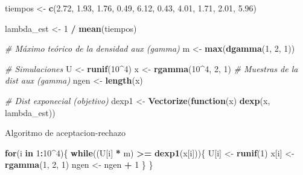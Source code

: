 \documentclass[
]{article}
\newenvironment{Shaded}{\begin{snugshade}}{\end{snugshade}}
\newcommand{\CommentTok}[1]{\textcolor[rgb]{0.56,0.35,0.01}{\textit{#1}}}
\newcommand{\ControlFlowTok}[1]{\textcolor[rgb]{0.13,0.29,0.53}{\textbf{#1}}}
\newcommand{\DecValTok}[1]{\textcolor[rgb]{0.00,0.00,0.81}{#1}}
\newcommand{\FloatTok}[1]{\textcolor[rgb]{0.00,0.00,0.81}{#1}}
\newcommand{\FunctionTok}[1]{\textcolor[rgb]{0.13,0.29,0.53}{\textbf{#1}}}
\newcommand{\NormalTok}[1]{#1}
\newcommand{\OtherTok}[1]{\textcolor[rgb]{0.56,0.35,0.01}{#1}}
\newcommand{\SpecialCharTok}[1]{\textcolor[rgb]{0.81,0.36,0.00}{\textbf{#1}}}
\begin{document}
\begin{Shaded}
\begin{Highlighting}[]
\NormalTok{tiempos }\OtherTok{\textless{}{-}} \FunctionTok{c}\NormalTok{(}\FloatTok{2.72}\NormalTok{, }\FloatTok{1.93}\NormalTok{, }\FloatTok{1.76}\NormalTok{, }\FloatTok{0.49}\NormalTok{, }\FloatTok{6.12}\NormalTok{, }\FloatTok{0.43}\NormalTok{, }\FloatTok{4.01}\NormalTok{, }\FloatTok{1.71}\NormalTok{, }\FloatTok{2.01}\NormalTok{, }\FloatTok{5.96}\NormalTok{)}

\NormalTok{lambda\_est }\OtherTok{\textless{}{-}} \DecValTok{1} \SpecialCharTok{/} \FunctionTok{mean}\NormalTok{(tiempos)}

\CommentTok{\# Máximo teórico de la densidad aux (gamma)}
\NormalTok{m }\OtherTok{\textless{}{-}} \FunctionTok{max}\NormalTok{(}\FunctionTok{dgamma}\NormalTok{(}\DecValTok{1}\NormalTok{, }\DecValTok{2}\NormalTok{, }\DecValTok{1}\NormalTok{))}

\CommentTok{\# Simulaciones}
\NormalTok{U }\OtherTok{\textless{}{-}} \FunctionTok{runif}\NormalTok{(}\DecValTok{10}\SpecialCharTok{\^{}}\DecValTok{4}\NormalTok{)}
\NormalTok{x }\OtherTok{\textless{}{-}} \FunctionTok{rgamma}\NormalTok{(}\DecValTok{10}\SpecialCharTok{\^{}}\DecValTok{4}\NormalTok{, }\DecValTok{2}\NormalTok{, }\DecValTok{1}\NormalTok{)  }\CommentTok{\# Muestras de la dist aux (gamma)}
\NormalTok{ngen }\OtherTok{\textless{}{-}} \FunctionTok{length}\NormalTok{(x)}

\CommentTok{\# Dist exponecial (objetivo)}
\NormalTok{dexp1 }\OtherTok{\textless{}{-}} \FunctionTok{Vectorize}\NormalTok{(}\ControlFlowTok{function}\NormalTok{(x) }\FunctionTok{dexp}\NormalTok{(x, lambda\_est))}
\end{Highlighting}
\end{Shaded}

Algoritmo de aceptacion-rechazo

\begin{Shaded}
\begin{Highlighting}[]
\ControlFlowTok{for}\NormalTok{(i }\ControlFlowTok{in} \DecValTok{1}\SpecialCharTok{:}\DecValTok{10}\SpecialCharTok{\^{}}\DecValTok{4}\NormalTok{)\{}
  \ControlFlowTok{while}\NormalTok{((U[i] }\SpecialCharTok{*}\NormalTok{ m) }\SpecialCharTok{\textgreater{}=} \FunctionTok{dexp1}\NormalTok{(x[i]))\{ }
\NormalTok{    U[i] }\OtherTok{\textless{}{-}} \FunctionTok{runif}\NormalTok{(}\DecValTok{1}\NormalTok{)}
\NormalTok{    x[i] }\OtherTok{\textless{}{-}} \FunctionTok{rgamma}\NormalTok{(}\DecValTok{1}\NormalTok{, }\DecValTok{2}\NormalTok{, }\DecValTok{1}\NormalTok{)}
\NormalTok{    ngen }\OtherTok{\textless{}{-}}\NormalTok{ ngen }\SpecialCharTok{+} \DecValTok{1}
\NormalTok{  \}}
\NormalTok{\}}
\end{Highlighting}
\end{Shaded}
\end{document}
